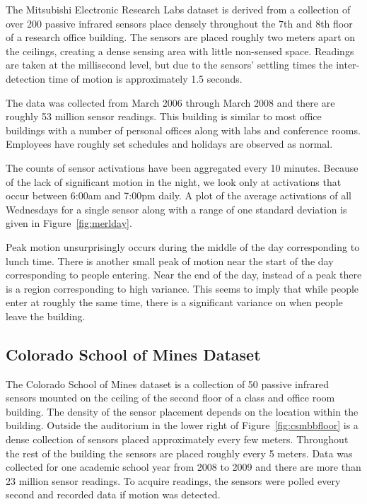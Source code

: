 The Mitsubishi Electronic Research Labs dataset is derived from a collection of over 200 passive infrared sensors place densely throughout the 7th and 8th floor of a research office building.  The sensors are placed roughly two meters apart on the ceilings, creating a dense sensing area with little non-sensed space.  Readings are taken at the millisecond level, but due to the sensors' settling times the inter-detection time of motion is approximately 1.5 seconds.

The data was collected from March 2006 through March 2008 and there are roughly 53 million sensor readings.  This building is similar to most office buildings with a number of personal offices along with labs and conference rooms.  Employees have roughly set schedules and holidays are observed as normal. 

The counts of sensor activations have been aggregated every 10 minutes.  Because of the lack of significant motion in the night, we look only at activations that occur between 6:00am and 7:00pm daily.  A plot of the average activations of all Wednesdays for a single sensor along with a range of one standard deviation is given in Figure~\ref{fig:merlday}.  

Peak motion unsurprisingly occurs during the middle of the day corresponding to lunch time.  There is another small peak of motion near the start of the day corresponding to people entering.  Near the end of the day, instead of a peak there is a region corresponding to high variance.  This seems to imply that while people enter at roughly the same time, there is a significant variance on when people leave the building.


\subsection{Colorado School of Mines Dataset}

The Colorado School of Mines dataset is a collection of 50 passive infrared sensors mounted on the ceiling of the second floor of a class and office room building.  The density of the sensor placement depends on the location within the building.  Outside the auditorium in the lower right of Figure~\ref{fig:csmbbfloor} is a dense collection of sensors placed approximately every few meters.  Throughout the rest of the building the sensors are placed roughly every 5 meters.  Data was collected for one academic school year from 2008 to 2009 and there are more than 23 million sensor readings.  To acquire readings, the sensors were polled every second and recorded data if motion was detected.  

